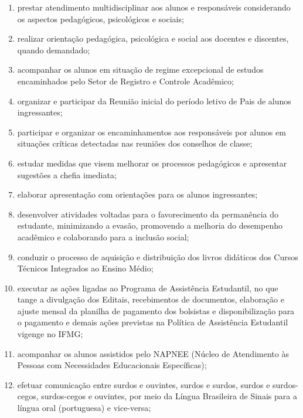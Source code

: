 \documentclass[a4paper,12pt]{report}
\begin{document}
\begin{enumerate}
\item prestar atendimento multidisciplinar aos alunos e responsáveis considerando os 
      aspectos pedagógicos, psicológicos e sociais;

\item realizar orientação pedagógica, psicológica e social aos docentes e discentes, 
      quando demandado;

\item acompanhar os alunos em situação de regime excepcional de estudos encaminhados 
      pelo Setor de Registro e Controle Acadêmico;

\item organizar e participar da Reunião inicial do período letivo de Pais de alunos 
      ingressantes;

\item participar e organizar os encaminhamentos aos responsáveis por alunos em situações 
      críticas detectadas nas reuniões dos conselhos de classe;

\item estudar medidas que visem melhorar os processos pedagógicos e apresentar sugestões a 
      chefia imediata;

\item elaborar apresentação com orientações para os alunos ingressantes;

\item desenvolver atividades voltadas para o favorecimento da permanência do estudante, 
      minimizando a evasão, promovendo a melhoria do desempenho acadêmico e colaborando 
      para a inclusão social;

\item conduzir o processo de aquisição e distribuição dos livros didáticos dos Cursos 
      Técnicos Integrados ao Ensino Médio;

\item executar as ações ligadas ao Programa de Assistência Estudantil, no que tange a 
      divulgação dos  Editais, recebimentos de documentos, elaboração e ajuste mensal da 
      planilha de pagamento dos bolsistas e disponibilização para o pagamento e demais 
      ações previstas na Política de Assistência Estudantil vigenge no IFMG;

\item acompanhar os alunos assistidos pelo NAPNEE (Núcleo de Atendimento às Pessoas com 
      Necessidades Educacionais Específicas);

\item efetuar comunicação entre surdos e ouvintes, surdos e surdos, surdos e surdos-cegos, 
      surdos-cegos e ouvintes, por meio da Língua Brasileira de Sinais para a língua oral 
      (portuguesa) e vice-versa;
      

\end{enumerate}
\end{document}
